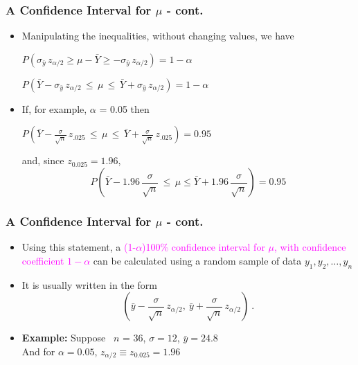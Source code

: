 \documentclass[xcolor=dvipsnames,12pt]{beamer}
\begin{document}
    
          
\begin{frame}
\frametitle{A Confidence  Interval for {\boldmath$\mu$} - cont.}
\begin{itemize}        
\item Manipulating the inequalities, without changing values, we have

\hspace*{.5in}$P(\sigma_{\bar{y}} \, z_{\alpha/2} \geq \mu - \bar{Y}
  \geq - \sigma_{\bar{y}} \, z_{\alpha/2}) = 1 - \alpha$

\hspace*{.5in}$P(\bar{Y} - \sigma_{\bar{y}} \, z_{\alpha/2}\, \leq\,
  \mu\, \leq\, \bar{Y} + \sigma_{\bar{y}} \, z_{\alpha/2}) = 1 - \alpha$

\item If, for example, $\alpha$ = 0.05 then

\hspace*{.5in}$P(\bar{Y} - \frac{\sigma}{\sqrt{n}} \, z_{.025}\, \leq
\,  \mu\, \leq\, \bar{Y} + \frac{\sigma}{\sqrt{n}} \, z_{.025}) =0.95$

 and, since $z_{0.025} = 1.96$,\\
$$
  P(\bar{Y} - 1.96\, \frac{\sigma}{\sqrt{n}}\, \leq\, \mu \leq \bar{Y} +
  1.96\, \frac{\sigma}{\sqrt{n}}) = 0.95
$$
\end{itemize}
\end{frame}


\begin{frame}
\frametitle{A Confidence  Interval for {\boldmath$\mu$} - cont.}
\begin{itemize}
\item  Using this statement, a \textcolor{magenta}{(1-\mbox{\boldmath$\alpha$})100\%
confidence interval for $\mu$, with confidence coefficient $1-\alpha$} can be calculated using a random sample of data $y_1,y_2,\ldots,y_n$

\item It is usually written in the form
$$
  \left( \bar{y} - \frac{\sigma}{\sqrt{n}} \, z_{\alpha/2}, \
         \bar{y} + \frac{\sigma}{\sqrt{n}} \, z_{\alpha/2}\right) \ .
$$
\item \textbf{Example:} Suppose \ $n$ = 36, $\sigma=12$, $\bar{y} = 24.8$\\[.1in] 
And for $\alpha=0.05$, $z_{\alpha/2} \equiv z_{0.025} = 1.96$
\end{itemize}
\end{frame}
\end{document}
